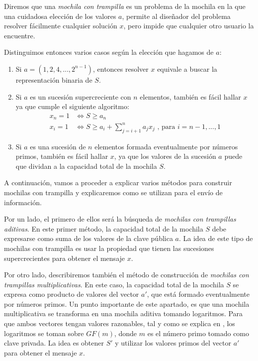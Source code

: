    Diremos que una \textit{mochila con trampilla} es un problema de la mochila en la que una cuidadosa elección de los valores $a$, permite al diseñador del problema resolver fácilmente cualquier solución $x$, pero impide que cualquier otro usuario la encuentre.

    \newpage
    
    Distinguimos entonces varios casos según la elección que hagamos de $a$:
    \begin{enumerate}
        \item Si $a = (1, 2, 4, ... , 2^{n-1})$, entonces resolver $x$ equivale a buscar la representación binaria de $S$.
        \item Si $a$ es un sucesión supercreciente con $n$ elementos, también es fácil hallar $x$ ya que cumple el siguiente algoritmo:
            \begin{align}
                x_{n} = 1 &\iff S \geq a_{n} \\
                x_{i} = 1 &\iff S \geq a_{i} + \sum_{j=i+1}^{n} a_{j}x_{j} \text{ ,~para } i = n-1, ... , 1
            \end{align}
        \item Si $a$ es una sucesión de $n$ elementos formada eventualmente por números primos, también es fácil hallar $x$, ya que los valores de la sucesión $a$ puede que dividan a la capacidad total de la mochila $S$.
    \end{enumerate}
    
    A continuación, vamos a proceder a explicar varios métodos para construir mochilas con trampilla y explicaremos como se utilizan para el envío de información. 
    
    Por un lado, el primero de ellos será la búsqueda de \textit{mochilas con trampillas aditivas}. En este primer método, la capacidad total de la mochila $S$ debe expresarse como suma de los valores de la clave pública $a$. La idea de este tipo de mochilas con trampilla es usar la propiedad que tienen las sucesiones supercrecientes para obtener el mensaje $x$.
    
    Por otro lado, describiremos también el método de construcción de \textit{mochilas con trampillas multiplicativas}. En este caso, la capacidad total de la mochila $S$ se expresa como producto de valores del vector $a'$, que está formado eventualmente por números primos. Un punto importante de este apartado, es que una mochila multiplicativa se transforma en una mochila aditiva tomando logaritmos. Para que ambos vectores tengan valores razonables, tal y como se explica en \cite{artPohligHellman}, los logaritmos se toman sobre $GF(m)$, donde $m$ es el número primo tomado como clave privada. La idea es obtener $S'$ y utilizar los valores primos del vector $a'$ para obtener el mensaje $x$.

